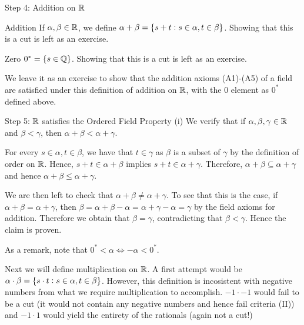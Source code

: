 \begin{nblank}{Step 4: Addition on $\mathbb{R}$}
    \begin{ndef}{Addition}
        If $\alpha, \beta \in \mathbb{R}$, we define $\alpha + \beta = \set{s + t: s \in \alpha, t \in \beta}$. Showing that this is a cut is left as an exercise.
    \end{ndef}
    \begin{ndef}{Zero}
        $0^* = \set{s \in \mathbb{Q}}$. Showing that this is a cut is left as an exercise.
    \end{ndef}

    We leave it as an exercise to show that the addition axioms (A1)-(A5) of a field are satisfied under this definition of addition on $\mathbb{R}$, with the 0 element as $0^*$ defined above.
\end{nblank}

\begin{nblank}{Step 5: $\mathbb{R}$ satisfies the Ordered Field Property (i)}
    We verify that if $\alpha, \beta, \gamma \in \mathbb{R}$ and $\beta < \gamma$, then $\alpha + \beta < \alpha + \gamma$. 

    For every $s \in \alpha, t \in \beta$, we have that $t \in \gamma$ as $\beta$ is a subset of $\gamma$ by the definition of order on $\mathbb{R}$. Hence, $s + t \in \alpha + \beta$ implies $s + t \in \alpha + \gamma$. Therefore, $\alpha + \beta \subseteq \alpha + \gamma$ and hence $\alpha + \beta \leq \alpha + \gamma$. 

    We are then left to check that $\alpha + \beta \neq \alpha + \gamma$. To see that this is the case, if $\alpha + \beta = \alpha + \gamma$, then $\beta = \alpha + \beta - \alpha = \alpha + \gamma - \alpha = \gamma$ by the field axioms for addition. Therefore we obtain that $\beta = \gamma$, contradicting that $\beta < \gamma$. Hence the claim is proven.

    As a remark, note that $0^* < \alpha \iff -\alpha < 0^*$.
\end{nblank}
\noindent Next we will define multiplication on $\mathbb{R}$. A first attempt would be $\alpha \cdot \beta = \set{s \cdot t: s\in \alpha, t \in \beta}$. However, this definition is incosistent with negative numbers from what we require multiplication to accomplish. $-1 \cdot -1$ would fail to be a cut (it would not contain any negative numbers and hence fail criteria (II)) and $-1 \cdot 1$ would yield the entirety of the rationals (again not a cut!)

